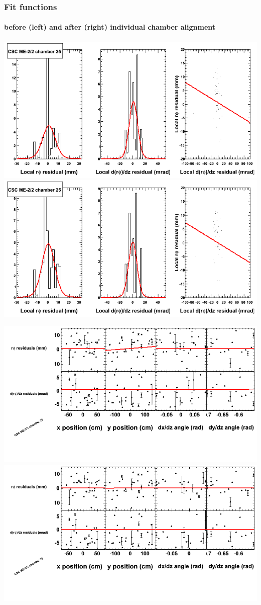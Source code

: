 \documentclass[compress]{beamer}
\begin{document}
\begin{frame}
\frametitle{Fit functions}
\framesubtitle{before (left) and after (right) individual chamber alignment}
\includegraphics[width=0.5\linewidth]{ringfits_3dof/beforefit_MEm22_25_bellcurve.png} \includegraphics[width=0.5\linewidth]{ringfits_3dof/afterfit_MEm22_25_bellcurve.png}

\includegraphics[width=0.5\linewidth]{ringfits_3dof/beforefit_MEm22_25_polynomials.png} \includegraphics[width=0.5\linewidth]{ringfits_3dof/afterfit_MEm22_25_polynomials.png}
\end{frame}
\end{document}
